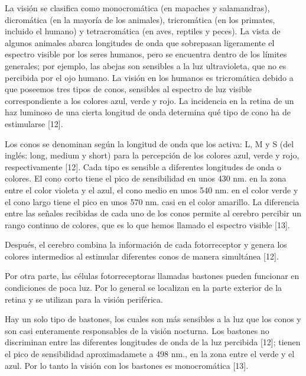 \documentclass[10pt]{article}
\begin{document}
\setlength{\parskip}{2mm}

La visión se clasifica como monocromática (en mapaches y salamandras), dicromática (en la mayoría de los animales), tricromática (en los primates, incluido el humano) y tetracromática (en aves, reptiles y peces). La vista de algunos animales abarca longitudes de onda que sobrepasan ligeramente el espectro visible por los seres humanos, pero se encuentra dentro de los límites generales; por ejemplo, las abejas son sensibles a la luz ultravioleta, que no es percibida por el ojo humano. La visión en los humanos es tricromática debido a que poseemos tres tipos de conos, sensibles al espectro de luz visible correspondiente a los colores azul, verde y rojo. La incidencia en la retina de un haz luminoso de una cierta longitud de onda determina qué tipo de cono ha de estimularse [12].

\setlength{\parskip}{2mm}

Los conos se denominan según la longitud de onda que los activa: L, M y S (del inglés: long, medium y short) para la percepción de los colores azul, verde y rojo, respectivamente [12]. Cada tipo es sensible a diferentes longitudes de onda o colores. El cono corto tiene el pico de sensibilidad en unos 430 nm. en la zona entre el color violeta y el azul, el cono medio en unos 540 nm. en el color verde y el cono largo tiene el pico en unos 570 nm. casi en el color amarillo. La diferencia entre las señales recibidas de cada uno de los conos permite al cerebro percibir un rango continuo de colores, que es lo que hemos llamado el espectro visible [13].

\setlength{\parskip}{2mm}

Después, el cerebro combina la información de cada fotorreceptor y genera los colores intermedios al estimular diferentes conos de manera simultánea [12].

\setlength{\parskip}{2mm}

Por otra parte, las células fotorreceptoras llamadas bastones pueden funcionar en condiciones de poca luz. Por lo general se localizan en la parte exterior de la retina y se utilizan para la visión periférica.

\setlength{\parskip}{2mm}

Hay un solo tipo de bastones, los cuales son más sensibles a la luz que los conos y son casi enteramente responsables de la visión nocturna. Los bastones no discriminan entre las diferentes longitudes de onda de la luz percibida [12]; tienen el pico de sensibilidad aproximadamete a 498 nm., en la zona entre el verde y el azul. Por lo tanto la visión con los bastones es monocromática [13].
\end{document}
